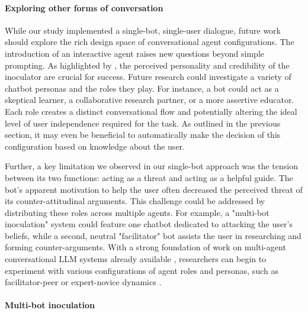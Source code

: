 \documentclass[sigconf]{acmart}
\begin{document}
\paragraph{Exploring other forms of conversation}

While our study implemented a single-bot, single-user dialogue, future work should explore the rich design space of conversational agent configurations. The introduction of an interactive agent raises new questions beyond simple prompting. As highlighted by \citet{Matusitz_Breen_2010}, the perceived personality and credibility of the inoculator are crucial for success. Future research could investigate a variety of chatbot personas and the roles they play. 
For instance, a bot could act as a skeptical learner, a collaborative research partner, or a more assertive educator. 
Each role creates a distinct conversational flow and potentially altering the ideal level of user independence required for the task. As outlined in the previous section, it may even be beneficial to automatically make the decision of this configuration based on knowledge about the user. 

Further, a key limitation we observed in our single-bot approach was the tension between its two functions: acting as a threat and acting as a helpful guide. The bot's apparent motivation to help the user often decreased the perceived threat of its counter-attitudinal arguments. This challenge could be addressed by distributing these roles across multiple agents. For example, a "multi-bot inoculation" system could feature one chatbot dedicated to attacking the user's beliefs, while a second, neutral "facilitator" bot assists the user in researching and forming counter-arguments. With a strong foundation of work on multi-agent conversational LLM systems already available \cite{geng2025beyond, Becker_2024,Ye_Liu_Wu_Pang_Yin_Bai_Chen_2025, Yan_Zhang_Zhang_Zhang_Zhou_Miao_Li_2025}, researchers can begin to experiment with various configurations of agent roles and personas, such as facilitator-peer or expert-novice dynamics \cite{geng2025beyond}.

\paragraph{Multi-bot inoculation}
\end{document}
